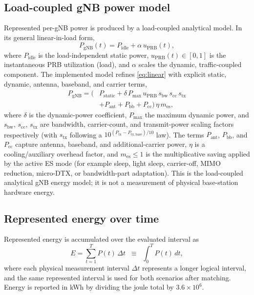 \documentclass[conference]{IEEEtran}
\begin{document}
\subsection{Load-coupled gNB power model}
Represented per-gNB power is produced by a load-coupled analytical model. In its general linear-in-load form,
\begin{equation}
P_{\mathrm{gNB}}(t) = P_{\mathrm{idle}} + \alpha\, u_{\mathrm{PRB}}(t), \label{eq:linear}
\end{equation}
where $P_{\mathrm{idle}}$ is the load-independent static power, $u_{\mathrm{PRB}}(t) \in [0,1]$ is the instantaneous PRB utilization (load), and $\alpha$ scales the dynamic, traffic-coupled component. The implemented model refines \eqref{eq:linear} with explicit static, dynamic, antenna, baseband, and carrier terms,
\begin{equation}
\begin{aligned}
P_{\mathrm{gNB}} = \big( & P_{\mathrm{static}} + \delta\,P_{\max}\, u_{\mathrm{PRB}}\, s_{\mathrm{bw}}\, s_{\mathrm{cc}}\, s_{\mathrm{tx}} \\
& + P_{\mathrm{ant}} + P_{\mathrm{bb}} + P_{\mathrm{cc}} \big)\, \eta\, m_{\mathrm{es}},
\end{aligned}\label{eq:fullpower}
\end{equation}
where $\delta$ is the dynamic-power coefficient, $P_{\max}$ the maximum dynamic power, and $s_{\mathrm{bw}}$, $s_{\mathrm{cc}}$, $s_{\mathrm{tx}}$ are bandwidth, carrier-count, and transmit-power scaling factors respectively (with $s_{\mathrm{tx}}$ following a $10^{(P_{\mathrm{tx}}-P_{\mathrm{tx,base}})/10}$ law). The terms $P_{\mathrm{ant}}$, $P_{\mathrm{bb}}$, and $P_{\mathrm{cc}}$ capture antenna, baseband, and additional-carrier power, $\eta$ is a cooling/auxiliary overhead factor, and $m_{\mathrm{es}}\le 1$ is the multiplicative saving applied by the active ES mode (for example sleep, light sleep, carrier-off, MIMO reduction, micro-DTX, or bandwidth-part adaptation). This is the load-coupled analytical gNB energy model; it is not a measurement of physical base-station hardware energy.

\subsection{Represented energy over time}
Represented energy is accumulated over the evaluated interval as
\begin{equation}
E = \sum_{t=1}^{T} P(t)\,\Delta t \;\;\equiv\;\; \int_{0}^{T} P(t)\,dt, \label{eq:energy}
\end{equation}
where each physical measurement interval $\Delta t$ represents a longer logical interval, and the same represented interval is used for both scenarios after matching. Energy is reported in kWh by dividing the joule total by $3.6\times10^{6}$.
\end{document}

